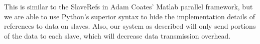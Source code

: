 \documentclass[%
  final,
  notitlepage,
  narroweqnarray,
  inline,
]{ieee}
\begin{document}
This is similar to the SlaveRefs in Adam Coates' Matlab parallel framework, but
we are able to use Python's superior syntax to hide the implementation details
of references to data on slaves. Also, our system as described will only send
portions of the data to each slave, which will decrease data transmission
overhead.

%
%

%
%
%
%
%
%
%
%
%
%
%
%
%
%
%
%
\end{document}
